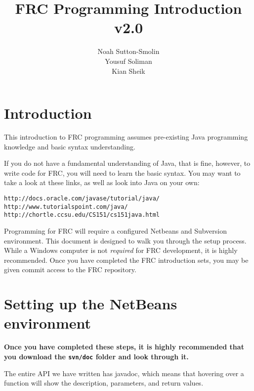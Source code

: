 \documentclass[a4paper]{article}
\title{FRC Programming Introduction v2.0}
\author{Noah Sutton-Smolin\\Yousuf Soliman\\Kian Sheik}
\begin{document}
\maketitle

\section{Introduction}

This introduction to FRC programming assumes pre-existing Java programming knowledge and basic syntax understanding.

If you do not have a fundamental understanding of Java, that is fine, however, to write code for FRC, you will need to learn the basic syntax. You may want to take a look at these links, as well as look into Java on your own:

\begin{lstlisting}
http://docs.oracle.com/javase/tutorial/java/
http://www.tutorialspoint.com/java/
http://chortle.ccsu.edu/CS151/cs151java.html
\end{lstlisting}

Programming for FRC will require a configured Netbeans and Subversion environment. This document is designed to walk you through the setup process. While a Windows computer is not \textit{required} for FRC development, it is highly recommended. Once you have completed the FRC introduction sets, you may be given commit access to the FRC repository.

\section{Setting up the NetBeans environment}

\textbf{Once you have completed these steps, it is highly recommended that you download the \lstinline{svn/doc} folder and look through it.}

The entire API we have written has javadoc, which means that hovering over a function will show the description, parameters, and return values.
\end{document}
